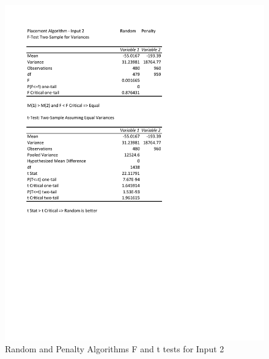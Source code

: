 \documentclass[times]{article}
\begin{document}
	\begin{figure}
		\caption{Random and Penalty Algorithms F and t tests for Input 2}
		\label{fig:random_penalty2}
		\includegraphics[width=\textwidth]{./t_test/Random_Penalty2}
	\end{figure}
%	


	
		
\end{document}
